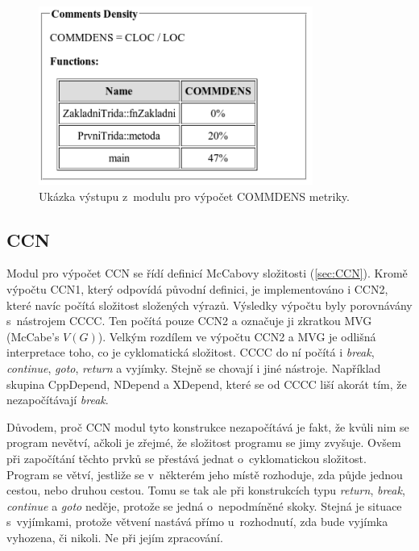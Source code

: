 \documentclass[11pt,twoside,a4paper]{book}
\begin{document}
\begin{figure}[H]
\begin{center}
\includegraphics[width=9cm]{figures/output_commdens.pdf}
\caption{Ukázka výstupu z~modulu pro výpočet COMMDENS metriky.}
\label{fig:out_commdens}
\end{center}
\end{figure}

\subsection{CCN}
\label{sec:TestovaniCCN}
Modul pro výpočet CCN se řídí definicí McCabovy složitosti (\ref{sec:CCN}). Kromě výpočtu CCN1, který odpovídá původní definici,
je implementováno i CCN2, které navíc počítá složitost složených výrazů. Výsledky výpočtu byly porovnávány s~nástrojem CCCC.
Ten počítá pouze CCN2 a označuje ji zkratkou MVG (McCabe's $V(G)$). Velkým rozdílem ve výpočtu CCN2 a MVG je odlišná interpretace toho, co je cyklomatická složitost.
CCCC do ní počítá i \textit{break}, \textit{continue}, \textit{goto}, \textit{return} a vyjímky.
Stejně se chovají i jiné nástroje. Například skupina CppDepend, NDepend a XDepend, které se od CCCC liší akorát tím, že nezapočítávají \textit{break}.

Důvodem, proč CCN modul tyto konstrukce nezapočítává je fakt, že kvůli nim se program nevětví, ačkoli je zřejmé, že složitost programu
se jimy zvyšuje. Ovšem při započítání těchto prvků se přestává jednat o~cyklomatickou složitost.
Program se větví, jestliže se v~některém jeho místě rozhoduje, zda půjde jednou cestou, nebo druhou cestou.
Tomu se tak ale při konstrukcích typu \textit{return}, \textit{break}, \textit{continue} a \textit{goto} neděje, protože se jedná o~nepodmíněné skoky.
Stejná je situace s~vyjímkami, protože větvení nastává přímo u~rozhodnutí, zda bude vyjímka vyhozena, či nikoli. Ne při jejím zpracování.
\end{document}
